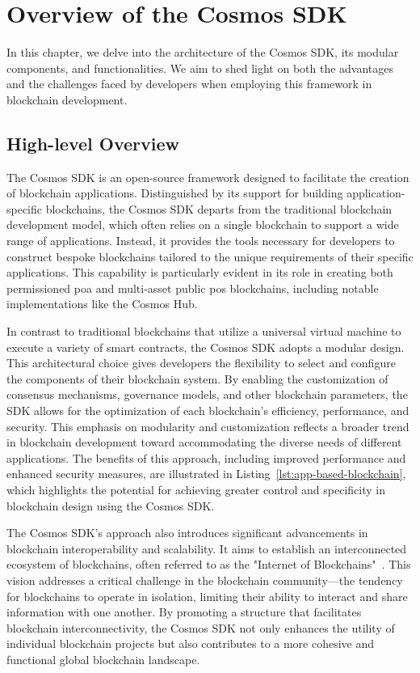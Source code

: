 \chapter{Overview of the Cosmos SDK}
\label{OCS:overview}

In this chapter, we delve into the architecture of the Cosmos SDK, its modular components, and functionalities. We aim to shed light on both the advantages and the challenges faced by developers when employing this framework in blockchain development.

\section{High-level Overview}

The Cosmos SDK is an open-source framework designed to facilitate the creation of blockchain applications. Distinguished by its support for building application-specific blockchains, the Cosmos SDK departs from the traditional blockchain development model, which often relies on a single blockchain to support a wide range of applications. Instead, it provides the tools necessary for developers to construct bespoke blockchains tailored to the unique requirements of their specific applications. This capability is particularly evident in its role in creating both permissioned \gls{poa} and multi-asset public \gls{pos} blockchains, including notable implementations like the Cosmos Hub\cite{cosmos-hub}.

In contrast to traditional blockchains that utilize a universal virtual machine to execute a variety of smart contracts, the Cosmos SDK adopts a modular design. This architectural choice gives developers the flexibility to select and configure the components of their blockchain system. By enabling the customization of consensus mechanisms, governance models, and other blockchain parameters, the SDK allows for the optimization of each blockchain's efficiency, performance, and security. This emphasis on modularity and customization reflects a broader trend in blockchain development toward accommodating the diverse needs of different applications. The benefits of this approach, including improved performance and enhanced security measures, are illustrated in Listing~\ref{lst:app-based-blockchain}, which highlights the potential for achieving greater control and specificity in blockchain design using the Cosmos SDK\cite{kwon2019cosmos}.

The Cosmos SDK's approach also introduces significant advancements in blockchain interoperability and scalability. It aims to establish an interconnected ecosystem of blockchains, often referred to as the "Internet of Blockchains"~\cite{kwon2019cosmos}. This vision addresses a critical challenge in the blockchain community—the tendency for blockchains to operate in isolation, limiting their ability to interact and share information with one another. By promoting a structure that facilitates blockchain interconnectivity, the Cosmos SDK not only enhances the utility of individual blockchain projects but also contributes to a more cohesive and functional global blockchain landscape.

